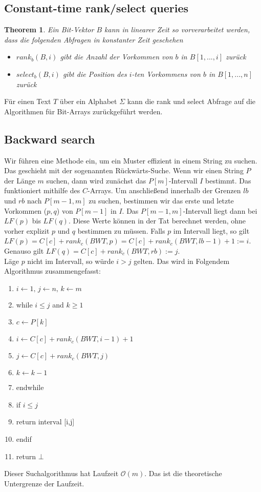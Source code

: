 \documentclass[a4paper, 12pt]{article}
\theoremstyle{plain}
\newtheorem{theorem}{Theorem}[subsection] %
\theoremstyle{definition}
\theoremstyle{lemma}
\theoremstyle{remark}
\theoremstyle{corollary}
\theoremstyle{example}
\begin{document}
	\subsection{Constant-time rank/select queries}
	\begin{theorem}
		Ein Bit-Vektor $B$ kann in linearer Zeit so vorverarbeitet werden, dass die folgenden Abfragen in konstanter Zeit geschehen
		\begin{itemize}
			\item $rank_b(B,i)$ gibt die Anzahl der Vorkommen von $b$ in $B[1,...,i]$ zurück
			\item $select_b(B,i)$ gibt die Position des $i$-ten Vorkommens von $b$ in $B[1,...,n]$ zurück
		\end{itemize}
	\end{theorem}
	\noindent Für einen Text $T$ über ein Alphabet $\Sigma$ kann die rank und select Abfrage auf die Algorithmen für Bit-Arrays zurückgeführt werden.
	\subsection{Backward search}
	Wir führen eine Methode ein, um ein Muster effizient in einem String zu suchen. Das geschieht mit der sogenannten Rückwärts-Suche. Wenn wir einen String $P$ der Länge $m$ suchen, dann wird zunächst das $P[m]$-Intervall $I$ bestimmt. Das funktioniert mithilfe des $C$-Arrays. Um anschließend innerhalb der Grenzen $lb$ und $rb$ nach $P[m-1,m]$ zu suchen, bestimmen wir das erste und letzte Vorkommen ($p,q$) von $P[m-1]$ in $I$. Das $P[m-1,m]$-Intervall liegt dann bei $LF(p)$ bis $LF(q)$. Diese Werte können in der Tat berechnet werden, ohne vorher explizit $p$ und $q$ bestimmen zu müssen. Falls $p$ im Intervall liegt, so gilt $LF(p) = C[c] + rank_c(BWT,p) = C[c]+rank_c(BWT,lb-1)+1 := i$. Genauso gilt $LF(q) = C[c] + rank_c(BWT,rb):= j$.\\
	Läge $p$ nicht im Intervall, so würde $i>j$ gelten. Das wird in Folgendem Algorithmus zusammengefasst:\\
	\begin{enumerate}
		\item $i\gets 1, \, j\gets n, \, k \gets m$
		\item while $i\leq j$ and $k\geq 1$
		\item $c\gets P[k]$
		\item $i\gets C[c] + rank_c(BWT,i-1)+1$
		\item $j\gets C[c] + rank_c(BWT,j)$
		\item $k\gets k-1$
		\item endwhile
		\item if $i\leq j$
		\item return interval [i,j]
		\item endif
		\item return $\bot$ 
	\end{enumerate} 
	Dieser Suchalgorithmus hat Laufzeit $\mathcal{O}(m)$. Das ist die theoretische Untergrenze der Laufzeit.
\end{document}
